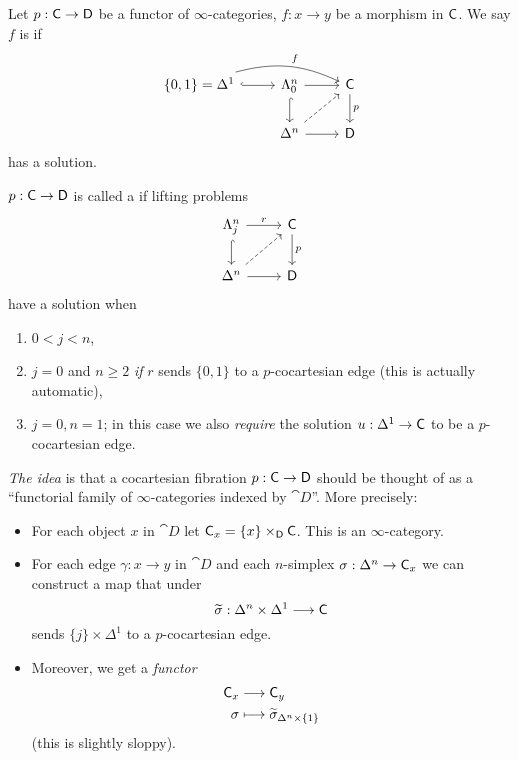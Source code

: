 \begin{definition}
	Let $p:\C\to \cat{D}$ be a functor of $\infty$-categories, $f:x\to y$ be a morphism in $\mathsf{C}$.  We say $f$ is  if
	\[
	\begin{tikzcd}
		\{0,1\} = \Delta^{1} \ar[r,hook] \ar[rr,bend left=20, "f"] & \Lambda_0^{n} \ar[r] \ar[d, hook] & \C \ar[d,"p"] \\
									   & \Delta^{n} \ar[r] \ar[ur,dashed] & \cat{D}
	\end{tikzcd}
	\] 
	has a solution.
\end{definition}
\begin{definition}
	$p:\C\to \cat{D}$ is called a  if lifting problems
	\[
	\begin{tikzcd}
		\Lambda_j^{n} \ar[r,"r"] \ar[d,hook] & \C \ar[d,"p"] \\
		\Delta^{n} \ar[r] \ar[ur,dashed] & \cat{D}
	\end{tikzcd}
	\] 
	have a solution when
	\begin{enumerate}[(1)]
		\item $0<j<n$,
		\item $j=0$ and $n\ge 2$ \emph{if} $r$ sends $\{0,1\} $ to a $p$-cocartesian edge (this is actually automatic),
		\item $j=0,n=1$; in this case we also \emph{require} the solution $u:\Delta^{1}\to \C$ to be a $p$-cocartesian edge.
	\end{enumerate}
\end{definition}
\emph{The idea} is that a cocartesian fibration $p:\C\to \cat{D}$ should be thought of as a ``functorial family of $\infty$-categories indexed by $\cat{D}$''. More precisely:
\begin{itemize}
	\item For each object $x$ in $\cat{D}$ let $\mathsf{C}_x = \{x\}\times_{\mathsf{D}}\mathsf{C}$. This is an $\infty$-category.
	\item For each edge $\gamma:x\to y$ in $\cat{D}$ and each $n$-simplex $\sigma:\Delta^{n}\to \C_x$ we can construct a map that under
		\[
			\wt{\sigma}: \Delta^{n}\times \Delta^{1} \to \C
		\] 
		sends $\{j\} \times \Delta^{1}$ to a $p$-cocartesian edge.
	\item Moreover, we get a \emph{functor}
		\begin{align*}
			\mathsf{C}_x &\longrightarrow \mathsf{C}_y \\
			\sigma &\longmapsto \widetilde{\sigma}_{\Delta^{n}\times \{1\} }
		\end{align*}
		(this is slightly sloppy).
\end{itemize}
